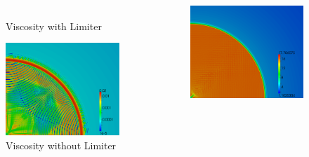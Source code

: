\documentclass[8pt,xcolor=svgnames]{beamer}
\begin{document}
\begin{frame}
\begin{columns}
\begin{column}{0.3\textwidth}
\begin{figure}[t]
\begin{center}
\\Viscosity with Limiter
\end{center}
\end{figure}
\begin{figure}[t]
\begin{center}
\includegraphics[height=0.9\textwidth]{figs/Noh/Q2nl-7-viscosity.png}
\\Viscosity without Limiter
\end{center}
\end{figure}
\end{column}
\begin{column}{0.3\textwidth}
\begin{figure}[t]
\begin{center}
\includegraphics[height=0.9\textwidth]{figs/Noh/Q2l-7-density.png}

\end{center}
\end{figure}
\end{column}
\end{columns}
\end{frame}
\end{document}

